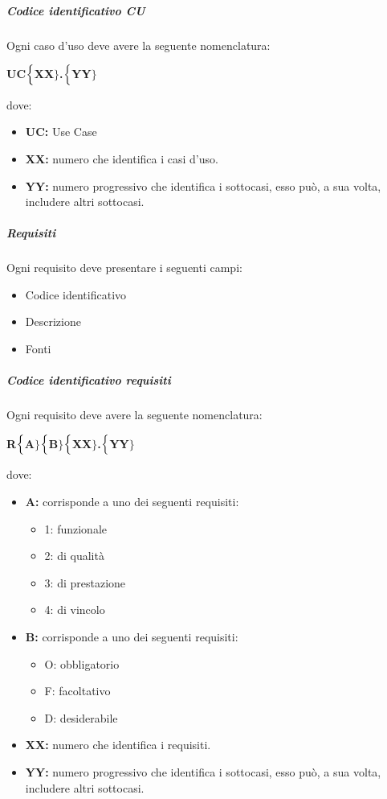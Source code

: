 \subparagraph{Codice identificativo CU}
Ogni caso d'uso deve avere la seguente nomenclatura:

\begin{center}
	\textbf{UC$\Bigl\{$XX$\Bigr\}$.$\Bigl\{$YY$\Bigr\}$}
\end{center}
dove:
\begin{itemize}
	\item \textbf{UC:} Use Case
	\item \textbf{{XX}:} numero che identifica i casi d'uso.
	\item \textbf{{YY}:} numero progressivo che identifica i sottocasi, esso può, a sua volta, includere altri sottocasi.
\end{itemize}

\subparagraph{Requisiti}
Ogni requisito deve presentare i seguenti campi:
\begin{itemize}
	\item Codice identificativo
	\item Descrizione
	\item Fonti
\end{itemize}

\subparagraph{Codice identificativo requisiti}
Ogni requisito deve avere la seguente nomenclatura:
\begin{center}
	\textbf{R$\Bigl\{$A$\Bigr\}$$\Bigl\{$B$\Bigr\}$$\Bigl\{$XX$\Bigr\}$.$\Bigl\{$YY$\Bigr\}$}
\end{center}
dove:
\begin{itemize}
	\item \textbf{A:} corrisponde a uno dei seguenti requisiti:
	\begin{itemize}
		\item 1: funzionale
		\item 2: di qualità
		\item 3: di prestazione
		\item 4: di vincolo
	\end{itemize}
	\item \textbf{B:} corrisponde a uno dei seguenti requisiti:
	\begin{itemize}
		\item O: obbligatorio
		\item F: facoltativo
		\item D: desiderabile
	\end{itemize}
	\item \textbf{{XX}:} numero che identifica i requisiti.
	\item \textbf{{YY}:} numero progressivo che identifica i sottocasi, esso può, a sua volta, includere altri sottocasi.
\end{itemize}

